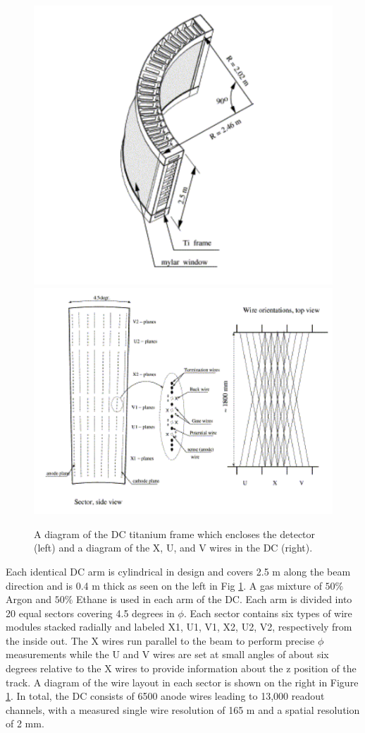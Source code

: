 \begin{figure}[!ht]
\begin{center}
\includegraphics[width=0.45\linewidth]{figs/dc_diagram.png}
\includegraphics[width=0.45\linewidth]{figs/dc_wire_diagram.png}
\caption{A diagram of the DC titanium frame which encloses the detector (left) and a diagram of the X, U, and V wires in the DC (right).}
\label{fig:dc_diagram}
\end{center}
\end{figure}

Each identical DC arm is cylindrical in design and covers 2.5 m along the beam direction and is 0.4 m thick as seen on the left in Fig \ref{fig:dc_diagram}. A gas mixture of $50\%$ Argon and $50\%$ Ethane is used in each arm of the DC. Each arm is divided into 20 equal sectors covering 4.5 degrees in $\phi$. Each sector contains six types of wire modules stacked radially and labeled X1, U1, V1, X2, U2, V2, respectively from the inside out. The X wires run parallel to the beam to perform precise $\phi$ measurements while the U and V wires are set at small angles of about six degrees relative to the X wires to provide information about the z position of the track. A diagram of the wire layout in each sector is shown on the right in Figure \ref{fig:dc_diagram}. In total, the DC consists of 6500 anode wires leading to 13,000 readout channels, with a measured single wire resolution of 165 m and a spatial resolution of  2 mm.

